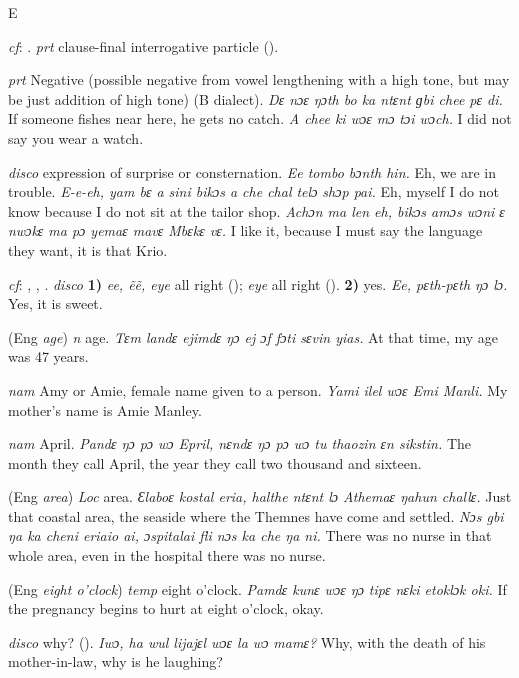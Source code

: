 \begin{letter}{E}

 \textit{cf}: . \textit{prt} clause-final interrogative particle (\citealt{Pichl1967}). 

 \textit{prt} Negative (possible negative from vowel lengthening with a high tone, but may be just addition of high tone) (B dialect). \textit{Dɛ nɔɛ ŋɔth bo ka ntɛnt ɡbi chee pɛ di.} If someone fishes near here, he gets no catch. \textit{A chee ki wɔɛ mɔ tɔi wɔch.} I did not say you wear a watch.

 \textit{disco} expression of surprise or consternation. \textit{Ee tombo bɔnth hin.} Eh, we are in trouble. \textit{E-e-eh, yam bɛ a sini bikɔs a che chal telɔ shɔp pai.} Eh, myself I do not know because I do not sit at the tailor shop. \textit{Achɔn ma len eh, bikɔs amɔs wɔni ɛ nwɔkɛ ma pɔ yemaɛ mavɛ Mbɛkɛ vɛ.} I like it, because I must say the language they want, it is that Krio.

 \textit{cf}: , , . \textit{disco} \textbf{1)} \textit{ee, ẽẽ, eye} all right (\citealt{Pichl1967}); \textit{eye} all right (\citealt{Sumner1921}). \textbf{2)} yes. \textit{Ee, pɛth-pɛth ŋɔ lɔ.} Yes, it is sweet.

 (Eng \textit{age}) \textit{n} age. \textit{Tɛm landɛ ejimdɛ ŋɔ ej ɔf fɔti sɛvin yias.} At that time, my age was 47 years.

 \textit{nam} Amy or Amie, female name given to a person. \textit{Yami ilel wɔɛ Emi Manli.} My mother's name is Amie Manley.

 \textit{nam} April. \textit{Pandɛ ŋɔ pɔ wɔ Epril, nɛndɛ ŋɔ pɔ wɔ tu thaozin ɛn sikstin.} The month they call April, the year they call two thousand and sixteen.

 (Eng \textit{area}) \textit{Loc} area. \textit{Ɛlaboɛ kostal eria, halthe ntɛnt lɔ Athemaɛ ŋahun challɛ.} Just that coastal area, the seaside where the Themnes have come and settled. \textit{Nɔs gbi ŋa ka cheni eriaio ai, ɔspitalai fli nɔs ka che ŋa ni.} There was no nurse in that whole area, even in the hospital there was no nurse.

 (Eng \textit{eight o'clock}) \textit{temp} eight o'clock. \textit{Pamdɛ kunɛ wɔɛ ŋɔ tipɛ nɛki etoklɔk oki.} If the pregnancy begins to hurt at eight o'clock, okay.

 \textit{disco} why? (\citealt{Sumner1921}). \textit{Iwɔ, ha wul lijajɛl wɔɛ la wɔ mamɛ?} Why, with the death of his mother-in-law, why is he laughing?


\end{letter}
